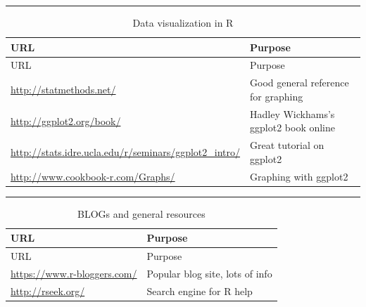 \documentclass[
]{book}
\begin{document}
\begin{center}\rule{0.5\linewidth}{0.5pt}\end{center}

\begin{longtable}[]{@{}
  >{\raggedright\arraybackslash}p{}
  >{\raggedright\arraybackslash}p{}@{}}
\caption{Data visualization in R}\tabularnewline
\toprule\noalign{}
\begin{minipage}[b]{\linewidth}\raggedright
URL
\end{minipage} & \begin{minipage}[b]{\linewidth}\raggedright
Purpose
\end{minipage} \\
\midrule\noalign{}
\endfirsthead
\toprule\noalign{}
\begin{minipage}[b]{\linewidth}\raggedright
URL
\end{minipage} & \begin{minipage}[b]{\linewidth}\raggedright
Purpose
\end{minipage} \\
\midrule\noalign{}
\endhead
\bottomrule\noalign{}
\endlastfoot
\url{http://statmethods.net/} & Good general reference for graphing \\
\url{http://ggplot2.org/book/} & Hadley Wickhams's ggplot2 book online \\
\url{http://stats.idre.ucla.edu/r/seminars/ggplot2_intro/} & Great tutorial on ggplot2 \\
\url{http://www.cookbook-r.com/Graphs/} & Graphing with ggplot2 \\
\end{longtable}

\begin{center}\rule{0.5\linewidth}{0.5pt}\end{center}

\begin{longtable}[]{@{}ll@{}}
\caption{BLOGs and general resources}\tabularnewline
\toprule\noalign{}
URL & Purpose \\
\midrule\noalign{}
\endfirsthead
\toprule\noalign{}
URL & Purpose \\
\midrule\noalign{}
\endhead
\bottomrule\noalign{}
\endlastfoot
\url{https://www.r-bloggers.com/} & Popular blog site, lots of info \\
\url{http://rseek.org/} & Search engine for R help \\
\end{longtable}
\end{document}
